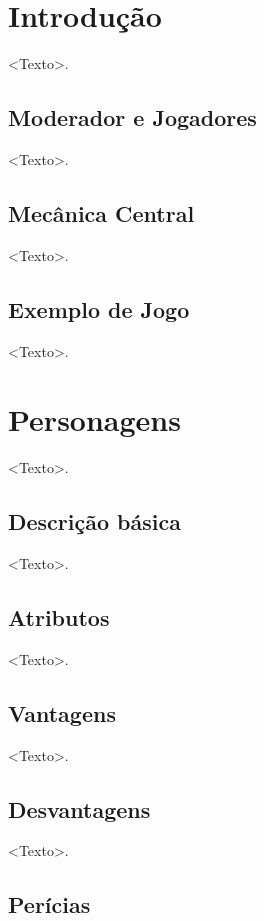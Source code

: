 \documentclass[a4paper, twocolumn, 10pt]{book}
\begin{document}
\chapter{Introdução}

<Texto>.

\section{Moderador e Jogadores}

<Texto>.

\section{Mecânica Central}

<Texto>.

\section{Exemplo de Jogo}

<Texto>.

\chapter{Personagens}

<Texto>.

\section{Descrição básica}

<Texto>.

\section{Atributos}

<Texto>.

\section{Vantagens}

<Texto>.

\section{Desvantagens}

<Texto>.

\section{Perícias}
\end{document}
